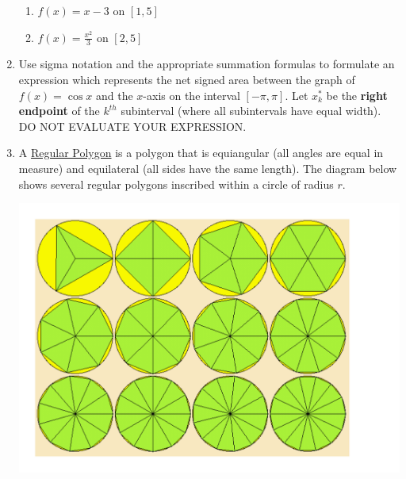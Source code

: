 \documentclass[12pt]{article}
\newif\ifans
\begin{document}
\begin{enumerate}
\begin{enumerate}

\item $f(x)=x-3$ on $[1,5]$

\ifans{\fbox{0}} \fi

\item $f(x)=\frac{x^2}{3}$ on $[2,5]$

\ifans{\fbox{13}} \fi

\end{enumerate}

\item Use sigma notation and the appropriate summation formulas to formulate an expression which represents the net signed area between the graph of $f(x)=\cos{x}$ and the $x$-axis on the interval $[-\pi,\pi]$.  Let $x_k^*$ be the {\bf right endpoint} of the $k^{th}$ subinterval (where all subintervals have equal width).  DO NOT EVALUATE YOUR EXPRESSION.

\ifans{\fbox{$\sum_{k=1}^n\cos{\left(-\pi+\frac{2\pi}{n}k\right)}\frac{2\pi}{n}$}} \fi

\medskip

\item A \underline{Regular Polygon} is a polygon that is equiangular (all angles are equal in measure) and equilateral (all sides have the same length).  The diagram below shows several regular polygons inscribed within a circle of radius $r$.

\begin{center}

\includegraphics[scale=0.4]{Inscribed.pdf}

\end{center}


\end{enumerate}
\end{document}
